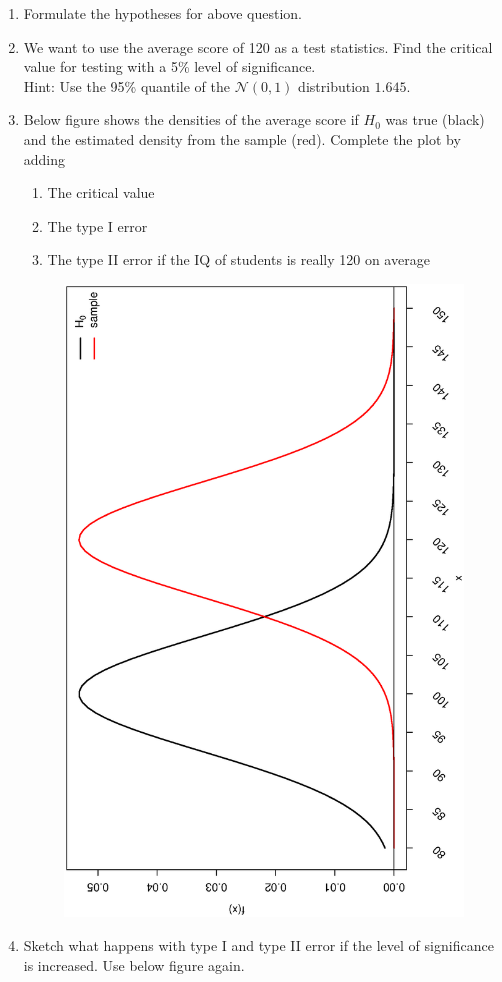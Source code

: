 \documentclass[captions=tableheading, 12pt, headings=small, parskip=half]{scrartcl}
\begin{document}
\begin{enumerate}[label = \alph*)]
	\item Formulate the hypotheses for above question.
	\item We want to use the average score of 120 as a test statistics. Find the critical value for testing with a 5\% level of significance.\\
	Hint: Use the 95\% quantile of the $\mathcal{N}(0,1)$ distribution $1.645$.
	\item Below figure shows the densities of the average score if $H_0$ was true (black) and the estimated density from the sample (red). Complete the plot by adding
	\begin{enumerate}[label = (\roman*)]
		\item The critical value
		\item The type I error
		\item The type II error if the IQ of students is really 120 on average
	\end{enumerate}
\begin{figure}[H]
	\centering
	\includegraphics[height = \columnwidth, angle = -90]{Code1/IQ.eps}
\end{figure}
	\item Sketch what happens with type I and type II error if the level of significance is increased. Use below figure again.

\end{enumerate}
\end{document}
